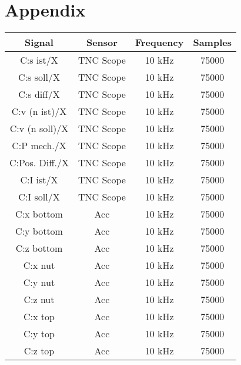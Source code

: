 \chapter{Appendix}



\begin{center}
\begin{longtable}{c c c c} 
 \toprule
 Signal & Sensor & Frequency & Samples \\ [0.5ex] 
 \midrule
 C:s ist/X & TNC Scope & 10 kHz & 75000 \\ 

 C:s soll/X & TNC Scope & 10 kHz & 75000 \\ 

 C:s diff/X & TNC Scope & 10 kHz & 75000 \\ 

 C:v (n ist)/X & TNC Scope & 10 kHz & 75000 \\ 

 C:v (n soll)/X& TNC Scope & 10 kHz & 75000 \\ 

 C:P mech./X & TNC Scope & 10 kHz & 75000 \\ 

 C:Pos. Diff./X & TNC Scope & 10 kHz & 75000 \\ 

 C:I ist/X & TNC Scope & 10 kHz & 75000 \\ 

 C:I soll/X & TNC Scope & 10 kHz & 75000 \\ 

 C:x bottom & Acc & 10 kHz & 75000 \\ 

 C:y bottom & Acc & 10 kHz & 75000 \\ 

 C:z bottom & Acc & 10 kHz & 75000 \\ 

 C:x nut & Acc & 10 kHz & 75000 \\ 

 C:y nut & Acc & 10 kHz & 75000 \\ 

 C:z nut & Acc & 10 kHz & 75000 \\ 

 C:x top & Acc & 10 kHz & 75000 \\ 

 C:y top & Acc & 10 kHz & 75000 \\ 

 C:z top & Acc & 10 kHz & 75000 \\ 


\end{longtable}
\end{center}

